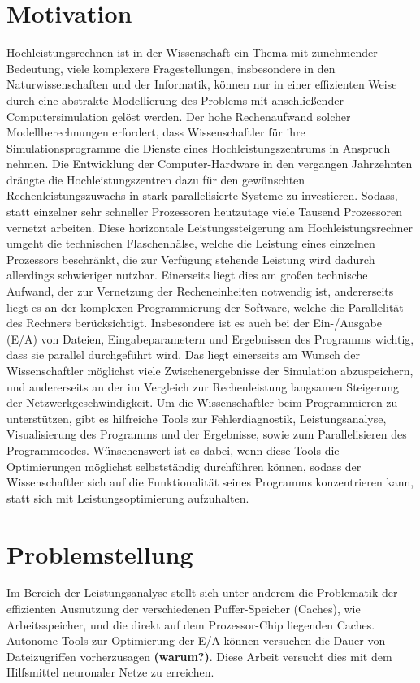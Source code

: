 \documentclass[
	12pt,
	a4paper,
	BCOR10mm,
	DIV14,
	listof=totoc,
	bibliography=totoc,
	headsepline
]{scrreprt}
\begin{document}
\section{Motivation}

Hochleistungsrechnen ist in der Wissenschaft ein Thema mit zunehmender Bedeutung, viele komplexere Fragestellungen, insbesondere in den Naturwissenschaften und der Informatik, können nur in einer effizienten Weise durch eine abstrakte Modellierung des Problems mit anschließender Computersimulation gelöst werden. Der hohe Rechenaufwand solcher Modellberechnungen erfordert, dass Wissenschaftler für ihre Simulationsprogramme die Dienste eines Hochleistungszentrums in Anspruch nehmen. 
Die Entwicklung der Computer-Hardware in den vergangen Jahrzehnten drängte die Hochleistungszentren dazu für den gewünschten Rechenleistungszuwachs in stark parallelisierte Systeme zu investieren. Sodass, statt einzelner sehr schneller Prozessoren heutzutage viele Tausend Prozessoren vernetzt arbeiten. Diese horizontale Leistungssteigerung am Hochleistungsrechner umgeht die technischen Flaschenhälse, welche die Leistung eines einzelnen Prozessors beschränkt, die zur Verfügung stehende Leistung wird dadurch allerdings schwieriger nutzbar. 
Einerseits liegt dies am großen  technische Aufwand, der zur Vernetzung der Recheneinheiten notwendig ist, andererseits liegt es an der komplexen Programmierung der Software, welche die Parallelität des Rechners berücksichtigt. Insbesondere ist es auch bei der Ein-/Ausgabe (E/A) von Dateien, Eingabeparametern und Ergebnissen des Programms wichtig, dass sie parallel durchgeführt wird. Das liegt einerseits am Wunsch der Wissenschaftler möglichst viele Zwischenergebnisse der Simulation abzuspeichern, und andererseits an der im Vergleich zur Rechenleistung langsamen Steigerung der Netzwerkgeschwindigkeit.
Um die Wissenschaftler beim Programmieren zu unterstützen, gibt es hilfreiche Tools zur Fehlerdiagnostik, Leistungsanalyse, Visualisierung des Programms und der Ergebnisse, sowie zum Parallelisieren des Programmcodes. Wünschenswert ist es dabei, wenn diese Tools die Optimierungen möglichst selbstständig durchführen können, sodass der Wissenschaftler sich auf die Funktionalität seines Programms konzentrieren kann, statt sich mit Leistungsoptimierung aufzuhalten.

\section{Problemstellung}

Im Bereich der Leistungsanalyse stellt sich unter anderem die Problematik der effizienten Ausnutzung der verschiedenen Puffer-Speicher (Caches), wie Arbeitsspeicher, und die direkt auf dem Prozessor-Chip liegenden Caches. Autonome Tools zur Optimierung der E/A können versuchen die Dauer von Dateizugriffen vorherzusagen \textbf{(warum?)}. Diese Arbeit versucht dies mit dem Hilfsmittel neuronaler Netze zu erreichen. 
\end{document}
